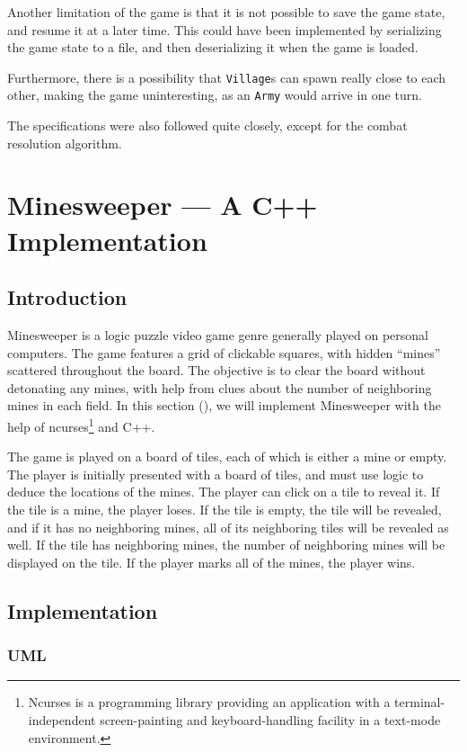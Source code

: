 \documentclass{article}
\newcommand{\code}[1]{\texttt{#1}}
\begin{document}
Another limitation of the game is that it is not possible to save the game state, and
resume it at a later time. This could have been implemented by serializing the game state
to a file, and then deserializing it when the game is loaded.

Furthermore, there is a possibility that \code{Village}s can spawn really close to each other,
making the game uninteresting, as an \code{Army} would arrive in one turn.

The specifications were also followed quite closely, except for the combat resolution algorithm.


\newpage

\section{Minesweeper --- A C++ Implementation}

\subsection{Introduction}
Minesweeper is a logic puzzle video game genre generally played on personal
computers. The game features a grid of clickable squares, with hidden ``mines''
scattered throughout the board. The objective is to clear the board without
detonating any mines, with help from clues about the number of neighboring
mines in each field.
In this section (\thesection), we will implement Minesweeper with the help of
ncurses\footnote{Ncurses is a programming library providing an application with a 
	terminal-independent screen-painting and keyboard-handling facility in a
text-mode environment.} and C++.

The game is played on a board of tiles, each of which is either a mine or
empty. The player is initially presented with a board of tiles, and
must use logic to deduce the locations of the mines. The player can click on a
tile to reveal it. If the tile is a mine, the player loses. If the tile is
empty, the tile will be revealed, and if it has no neighboring mines, all of
its neighboring tiles will be revealed as well. If the tile has neighboring
mines, the number of neighboring mines will be displayed on the tile. If the player
marks all of the mines, the player wins.


\subsection{Implementation}

\subsubsection{UML}
\end{document}
